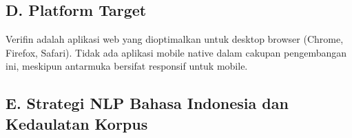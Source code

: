 \documentclass[12pt,a4paper]{article}
\begin{document}
\subsection*{D. Platform Target}
Verifin adalah aplikasi web yang dioptimalkan untuk desktop browser (Chrome, Firefox, Safari).
Tidak ada aplikasi mobile native dalam cakupan pengembangan ini, meskipun antarmuka bersifat
responsif untuk mobile.

\subsection*{\colorbox{yellow!40}{\textbf{E. Strategi NLP Bahasa Indonesia dan Kedaulatan Korpus}}}
{}
\end{document}

